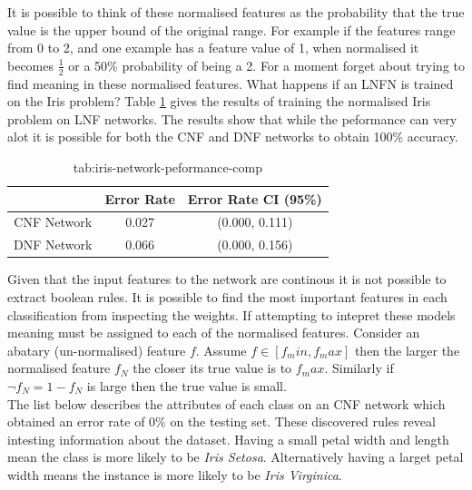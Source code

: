 It is possible to think of these normalised features as the probability that the true value is the upper bound of the original range. For example if the features range from 0 to 2, and one example has a feature value of 1, when normalised it becomes $\frac{1}{2}$ or a 50\% probability of being a 2. For a moment forget about trying to find meaning in these normalised features. What happens if an LNFN is trained on the Iris problem? Table \ref{tab:iris-network-peformance-comp} gives the results of training the normalised Iris problem on LNF networks. The results show that while the peformance can very alot it is possible for both the CNF and DNF networks to obtain 100\% accuracy.

\begin{table}[H]
	\begin{center}
		\begin{tabular}{| c | c | c |}
			\hline
			& Error Rate & Error Rate CI (95\%) \\
			\hline
			\hline
			CNF Network & 0.027 & (0.000, 0.111) \\
			\hline
			DNF Network & 0.066 & (0.000, 0.156) \\
			\hline
		\end{tabular}
	\end{center}
	\caption{tab:iris-network-peformance-comp}
	\label{tab:iris-network-peformance-comp}
\end{table}

Given that the input features to the network are continous it is not possible to extract boolean rules. It is possible to find the most important features in each classification from inspecting the weights. If attempting to intepret these models meaning must be assigned to each of the normalised features. Consider an abatary (un-normalised) feature $f$. Assume $f \in [f_min, f_max]$ then the larger the normalised feature $f_N$ the closer its true value is to $f_max$. Similarly if $\lnot f_N = 1 - f_N$ is large then the true value is small.\\

The list below describes the attributes of each class on an CNF network which obtained an error rate of 0\% on the testing set. These discovered rules reveal intesting information about the dataset. Having a small petal width and length mean the class is more likely to be \textit{Iris Setosa}. Alternatively having a larget petal width means the instance is more likely to be \textit{Iris Virginica}.

